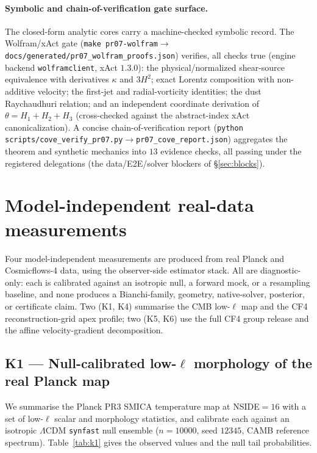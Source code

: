 \documentclass[11pt,a4paper]{article}
\theoremstyle{plain}
\theoremstyle{definition}
\begin{document}
\paragraph{Symbolic and chain-of-verification gate surface.}
The closed-form analytic cores carry a machine-checked symbolic record.
The Wolfram/xAct gate
(\texttt{make pr07-wolfram}$\to$\texttt{docs/generated/pr07\_wolfram\_proofs.json})
verifies, all checks true (engine backend \texttt{wolframclient}, xAct
$1.3.0$): the physical/normalized shear-source equivalence with
derivatives $\kappa$ and $3H^2$; exact Lorentz composition with
non-additive velocity; the first-jet and radial-vorticity identities;
the dust Raychaudhuri relation; and an independent coordinate derivation
of $\theta=H_1+H_2+H_3$ (cross-checked against the abstract-index xAct
canonicalization). A concise chain-of-verification report
(\texttt{python scripts/cove\_verify\_pr07.py}$\to$\texttt{pr07\_cove\_report.json})
aggregates the theorem and synthetic mechanics into $13$ evidence checks,
all passing under the registered delegations (the data/E2E/solver
blockers of \S\ref{sec:blocks}).

\section{Model-independent real-data measurements}
\label{sec:measurements}

Four model-independent measurements are produced from real Planck and
Cosmicflows-4 data, using the observer-side estimator stack. All are
diagnostic-only: each is calibrated against an isotropic null, a
forward mock, or a resampling baseline, and none produces a
Bianchi-family, geometry, native-solver, posterior, or certificate
claim. Two (K1, K4) summarise the CMB low-$\ell$ map and the CF4
reconstruction-grid apex profile; two (K5, K6) use the full CF4 group
release and the affine velocity-gradient decomposition.

\subsection{K1 --- Null-calibrated low-$\ell$ morphology of the real Planck map}
\label{sec:k1}

We summarise the Planck PR3 SMICA temperature map at NSIDE$=16$ with
a set of low-$\ell$ scalar and morphology statistics, and calibrate
each against an isotropic $\Lambda$CDM \texttt{synfast} null ensemble
($n=10000$, seed $12345$, CAMB reference spectrum). Table~\ref{tab:k1}
gives the observed values and the null tail probabilities.
\end{document}
